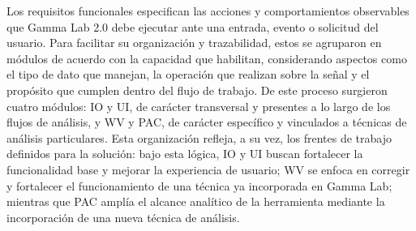 \documentclass[12pt,letterpaper,oneside]{article}
\begin{document}
Los requisitos funcionales especifican las acciones y comportamientos observables que Gamma Lab 2.0 debe ejecutar ante una entrada, evento o solicitud del usuario. Para facilitar su organización y trazabilidad, estos se agruparon en módulos de acuerdo con la capacidad que habilitan, considerando aspectos como el tipo de dato que manejan, la operación que realizan sobre la señal y el propósito que cumplen dentro del flujo de trabajo. De este proceso surgieron cuatro módulos: IO y UI, de carácter transversal y presentes a lo largo de los flujos de análisis, y WV y PAC, de carácter específico y vinculados a técnicas de análisis particulares. Esta organización refleja, a su vez, los frentes de trabajo definidos para la solución: bajo esta lógica, IO y UI buscan fortalecer la funcionalidad base y mejorar la experiencia de usuario; WV se enfoca en corregir y fortalecer el funcionamiento de una técnica ya incorporada en Gamma Lab; mientras que PAC amplía el alcance analítico de la herramienta mediante la incorporación de una nueva técnica de análisis.
\end{document}
